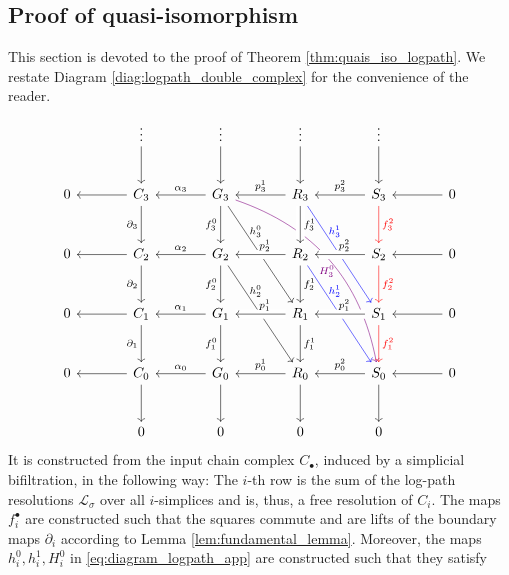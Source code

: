 \documentclass[11pt]{article}
\begin{document}
\subsection{Proof of quasi-isomorphism}
\label{app:quasiiso_logpath}
%
This section is devoted to the proof of Theorem \ref{thm:quais_iso_logpath}. We restate Diagram \ref{diag:logpath_double_complex} for the convenience of the reader.
\begin{equation} \label{eq:diagram_logpath_app}
\begin{tikzcd} [column sep=large,row sep=large]
& \vdots \arrow[d] & \vdots \arrow[d] & \vdots \arrow[d] & \vdots \arrow[d] \\
0 & C_3 \arrow[l] \arrow[d,swap,"\partial_3"] & G_3 \arrow[l,swap,"\alpha_3"] \arrow[d,swap,"f_3^0"] \arrow[ddr,"h_3^0"{xshift=-10pt,yshift=10pt}] \arrow[dddrr,violet,bend left,"H_3^0"{xshift=-10pt,yshift=-14pt}] & R_3 \arrow[l,swap,"p_3^1"] \arrow[d,crossing over,"f_3^1"] \arrow[ddr,blue,"h_3^1"{xshift=-10pt,yshift=10pt}] & S_3 \arrow[l,swap,"p^2_3"] \arrow[d,red,"f_3^2"] & 0 \arrow[l] \\
0 & C_2 \arrow[l] \arrow[d,swap,"\partial_2"] & G_2 \arrow[l,swap,"\alpha_2"] \arrow[d,swap,"f_2^0"] \arrow[ddr,"h_2^0"{xshift=-10pt,yshift=10pt}] & R_2 \arrow[l,swap,"p_2^1"{xshift=3pt},crossing over] \arrow[d,"f_2^1"] \arrow[ddr,blue,"h_2^1"{xshift=-10pt,yshift=10pt}] & S_2 \arrow[l,swap,"p^2_2"{xshift=3pt},crossing over] \arrow[d,red,"f_2^2"] & 0 \arrow[l] \\
0 & C_1 \arrow[l] \arrow[d,swap,"\partial_1"] & G_1 \arrow[l,swap,"\alpha_1"] \arrow[d,swap,"f_1^0"] & R_1 \arrow[l,swap,"p_1^1"{xshift=3pt},crossing over] \arrow[d,"f_1^1"] & S_1 \arrow[l,swap,"p^2_1"{xshift=3pt},crossing over] \arrow[d,red,"f_1^2"] & 0 \arrow[l] \\
0 & C_0 \arrow[l] \arrow[d] & G_0 \arrow[l,swap,"\alpha_0"] \arrow[d] & R_0 \arrow[l,swap,"p_0^1"] \arrow[d] & S_0 \arrow[l,swap,"p^2_0"] \arrow [d]& 0 \arrow[l] \\
& 0 & 0 & 0 & 0
\end{tikzcd}
\end{equation} 
%
It is constructed from the input chain complex $C_\bullet$, induced by a simplicial bifiltration, in the following way: The $i$-th row is the sum of the log-path resolutions $\mathcal{L}_\sigma$ over all $i$-simplices and is, thus, a free resolution of $C_i$. The maps $f_i^\bullet$ are constructed such that the squares commute and are lifts of the boundary maps $\partial_i$ according to Lemma \ref{lem:fundamental_lemma}. Moreover, the maps $h^0_i,h^1_i,H^0_i$ in \eqref{eq:diagram_logpath_app} are constructed such that they satisfy
\end{document}
